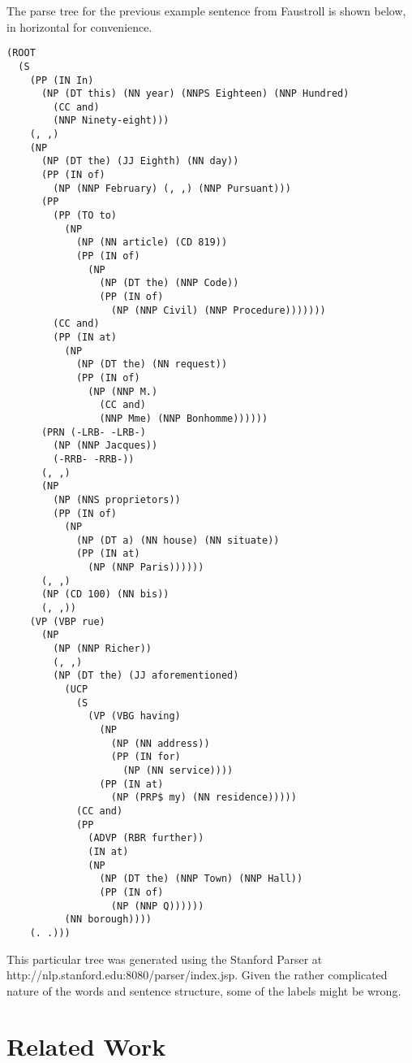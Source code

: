 The parse tree for the previous example sentence from Faustroll is shown below, in horizontal for convenience.

\begin{verbatim}
(ROOT
  (S
    (PP (IN In)
      (NP (DT this) (NN year) (NNPS Eighteen) (NNP Hundred)
        (CC and)
        (NNP Ninety-eight)))
    (, ,)
    (NP
      (NP (DT the) (JJ Eighth) (NN day))
      (PP (IN of)
        (NP (NNP February) (, ,) (NNP Pursuant)))
      (PP
        (PP (TO to)
          (NP
            (NP (NN article) (CD 819))
            (PP (IN of)
              (NP
                (NP (DT the) (NNP Code))
                (PP (IN of)
                  (NP (NNP Civil) (NNP Procedure)))))))
        (CC and)
        (PP (IN at)
          (NP
            (NP (DT the) (NN request))
            (PP (IN of)
              (NP (NNP M.)
                (CC and)
                (NNP Mme) (NNP Bonhomme))))))
      (PRN (-LRB- -LRB-)
        (NP (NNP Jacques))
        (-RRB- -RRB-))
      (, ,)
      (NP
        (NP (NNS proprietors))
        (PP (IN of)
          (NP
            (NP (DT a) (NN house) (NN situate))
            (PP (IN at)
              (NP (NNP Paris))))))
      (, ,)
      (NP (CD 100) (NN bis))
      (, ,))
    (VP (VBP rue)
      (NP
        (NP (NNP Richer))
        (, ,)
        (NP (DT the) (JJ aforementioned)
          (UCP
            (S
              (VP (VBG having)
                (NP
                  (NP (NN address))
                  (PP (IN for)
                    (NP (NN service))))
                (PP (IN at)
                  (NP (PRP$ my) (NN residence)))))
            (CC and)
            (PP
              (ADVP (RBR further))
              (IN at)
              (NP
                (NP (DT the) (NNP Town) (NNP Hall))
                (PP (IN of)
                  (NP (NNP Q))))))
          (NN borough))))
    (. .)))
\end{verbatim}

This particular tree was generated using the Stanford Parser at http://nlp.stanford.edu:8080/parser/index.jsp.
Given the rather complicated nature of the words and sentence structure, some of the labels might be wrong.


\section{Related Work}

